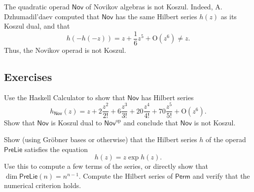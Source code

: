 %

\begin{example}
The quadratic operad $\mathsf{Nov}$ of Novikov algebras is not Koszul.
Indeed, A. Dzhumadil'daev computed that $\mathsf{Nov}$ has the same Hilbert
series $h(z)$ as its Koszul dual, and that 
 \[ h(-h(-z)) = z + \frac 16 z^5 + \mathrm{O}(z^6) \neq z.
 \] 
 Thus, the Novikov operad is not Koszul.
\end{example}


 
\subsection{Exercises}

\begin{question}
Use the Haskell Calculator to show that $\mathsf{Nov}$ has Hilbert series
\[
h_\mathsf{Nov}(z) = z +2 \frac{z^2}{2!} +6 \frac{z^3}{3!} + 20 \frac{z^4}{4!} + 70 \frac{z^5}{5!} +
\mathrm{O}(z^6).
\]
Show that $\mathsf{Nov}$ is Koszul dual to $\mathsf{Nov}^\mathrm{op}$
and conclude that $\mathsf{Nov}$ is not Koszul.
\end{question}
\begin{question}\label{ex:preLieHilbert}
Show (using Gr\"obner bases or otherwise) that the Hilbert series $h$
of the operad $\mathsf{PreLie}$ satisfies the equation
\[ h(z) = z\exp h(z) .\]
Use this to compute a few terms of the series, or directly
show that $\dim\mathsf{PreLie}(n) = n^{n-1}$. Compute
the Hilbert series of $\mathsf{Perm}$ and verify that
the numerical criterion holds.
\end{question}

